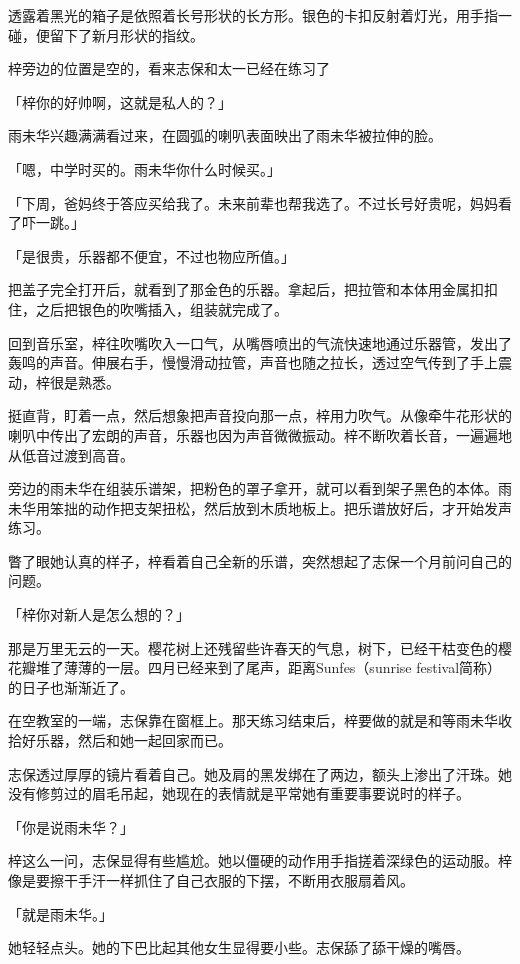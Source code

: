 \documentclass[UTF8]{ctexart}
\begin{document}
    透露着黑光的箱子是依照着长号形状的长方形。银色的卡扣反射着灯光，用手指一碰，便留下了新月形状的指纹。

    梓旁边的位置是空的，看来志保和太一已经在练习了

    「梓你的好帅啊，这就是私人的？」

    雨未华兴趣满满看过来，在圆弧的喇叭表面映出了雨未华被拉伸的脸。

    「嗯，中学时买的。雨未华你什么时候买。」

    「下周，爸妈终于答应买给我了。未来前辈也帮我选了。不过长号好贵呢，妈妈看了吓一跳。」

    「是很贵，乐器都不便宜，不过也物应所值。」

    把盖子完全打开后，就看到了那金色的乐器。拿起后，把拉管和本体用金属扣扣住，之后把银色的吹嘴插入，组装就完成了。

    回到音乐室，梓往吹嘴吹入一口气，从嘴唇喷出的气流快速地通过乐器管，发出了轰鸣的声音。伸展右手，慢慢滑动拉管，声音也随之拉长，透过空气传到了手上震动，梓很是熟悉。

    挺直背，盯着一点，然后想象把声音投向那一点，梓用力吹气。从像牵牛花形状的喇叭中传出了宏朗的声音，乐器也因为声音微微振动。梓不断吹着长音，一遍遍地从低音过渡到高音。

    旁边的雨未华在组装乐谱架，把粉色的罩子拿开，就可以看到架子黑色的本体。雨未华用笨拙的动作把支架扭松，然后放到木质地板上。把乐谱放好后，才开始发声练习。

    瞥了眼她认真的样子，梓看着自己全新的乐谱，突然想起了志保一个月前问自己的问题。

    「梓你对新人是怎么想的？」

    那是万里无云的一天。樱花树上还残留些许春天的气息，树下，已经干枯变色的樱花瓣堆了薄薄的一层。四月已经来到了尾声，距离Sunfes（sunrise festival简称）的日子也渐渐近了。

    在空教室的一端，志保靠在窗框上。那天练习结束后，梓要做的就是和等雨未华收拾好乐器，然后和她一起回家而已。

    志保透过厚厚的镜片看着自己。她及肩的黑发绑在了两边，额头上渗出了汗珠。她没有修剪过的眉毛吊起，她现在的表情就是平常她有重要事要说时的样子。

    「你是说雨未华？」

    梓这么一问，志保显得有些尴尬。她以僵硬的动作用手指搓着深绿色的运动服。梓像是要擦干手汗一样抓住了自己衣服的下摆，不断用衣服扇着风。

    「就是雨未华。」

    她轻轻点头。她的下巴比起其他女生显得要小些。志保舔了舔干燥的嘴唇。
\end{document}

